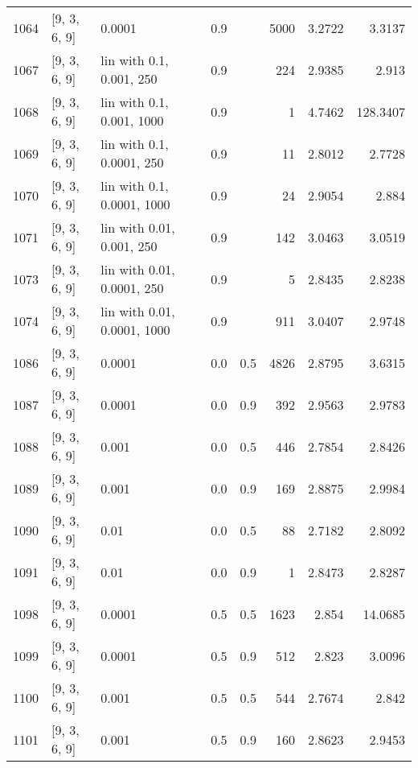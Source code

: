 \begin{longtable}{lllrrrrr}
 1064 &       [9, 3, 6, 9] &                      0.0001 &      0.9 &     & 5000 &   3.2722 &   3.3137 \\
 1067 &       [9, 3, 6, 9] &    lin with 0.1, 0.001, 250 &      0.9 &     &  224 &   2.9385 &    2.913 \\
 1068 &       [9, 3, 6, 9] &   lin with 0.1, 0.001, 1000 &      0.9 &     &    1 &   4.7462 & 128.3407 \\
 1069 &       [9, 3, 6, 9] &   lin with 0.1, 0.0001, 250 &      0.9 &     &   11 &   2.8012 &   2.7728 \\
 1070 &       [9, 3, 6, 9] &  lin with 0.1, 0.0001, 1000 &      0.9 &     &   24 &   2.9054 &    2.884 \\
 1071 &       [9, 3, 6, 9] &   lin with 0.01, 0.001, 250 &      0.9 &     &  142 &   3.0463 &   3.0519 \\
 1073 &       [9, 3, 6, 9] &  lin with 0.01, 0.0001, 250 &      0.9 &     &    5 &   2.8435 &   2.8238 \\
 1074 &       [9, 3, 6, 9] & lin with 0.01, 0.0001, 1000 &      0.9 &     &  911 &   3.0407 &   2.9748 \\
 1086 &       [9, 3, 6, 9] &                      0.0001 &      0.0 & 0.5 & 4826 &   2.8795 &   3.6315 \\
 1087 &       [9, 3, 6, 9] &                      0.0001 &      0.0 & 0.9 &  392 &   2.9563 &   2.9783 \\
 1088 &       [9, 3, 6, 9] &                       0.001 &      0.0 & 0.5 &  446 &   2.7854 &   2.8426 \\
 1089 &       [9, 3, 6, 9] &                       0.001 &      0.0 & 0.9 &  169 &   2.8875 &   2.9984 \\
 1090 &       [9, 3, 6, 9] &                        0.01 &      0.0 & 0.5 &   88 &   2.7182 &   2.8092 \\
 1091 &       [9, 3, 6, 9] &                        0.01 &      0.0 & 0.9 &    1 &   2.8473 &   2.8287 \\
 1098 &       [9, 3, 6, 9] &                      0.0001 &      0.5 & 0.5 & 1623 &    2.854 &  14.0685 \\
 1099 &       [9, 3, 6, 9] &                      0.0001 &      0.5 & 0.9 &  512 &    2.823 &   3.0096 \\
 1100 &       [9, 3, 6, 9] &                       0.001 &      0.5 & 0.5 &  544 &   2.7674 &    2.842 \\
 1101 &       [9, 3, 6, 9] &                       0.001 &      0.5 & 0.9 &  160 &   2.8623 &   2.9453 \\

\end{longtable}
